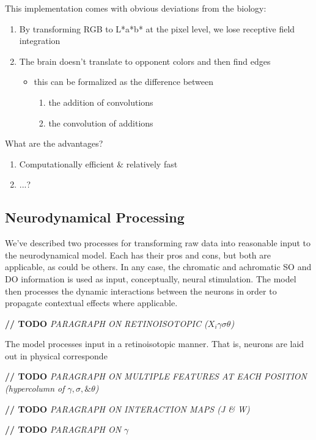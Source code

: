 \documentclass[journal,onecolumn]{IEEEtran}
\begin{document}
This implementation comes with obvious deviations from the biology:
\begin{enumerate}
    \item By transforming RGB to L*a*b* at the pixel level, we lose receptive field integration
    \item The brain doesn't translate to opponent colors and then find edges
    \begin{itemize}
        \item this can be formalized as the difference between
        \begin{enumerate}
            \item the addition of convolutions
            \item the convolution of additions
        \end{enumerate}
    \end{itemize}
\end{enumerate}

What are the advantages?
\begin{enumerate}
    \item Computationally efficient \& relatively fast
    \item ...?
\end{enumerate}


\subsection*{Neurodynamical Processing}

We've described two processes for transforming raw data into reasonable input to the neurodynamical model. Each has their pros and cons, but both are applicable, as could be others. In any case, the chromatic and achromatic SO and DO information is used as input, conceptually, neural stimulation. The model then processes the dynamic interactions between the neurons in order to propagate contextual effects where applicable.

\textbf{// TODO} \textit{PARAGRAPH ON RETINOISOTOPIC ($X_{i}\gamma\sigma\theta$)}

The model processes input in a retinoisotopic manner. That is, neurons are laid out in physical corresponde

\textbf{// TODO} \textit{PARAGRAPH ON MULTIPLE FEATURES AT EACH POSITION (hypercolumn of $\gamma, \sigma, \& \theta$)}

\textbf{// TODO} \textit{PARAGRAPH ON INTERACTION MAPS (J \& W)}

\textbf{// TODO} \textit{PARAGRAPH ON $\gamma$}
\end{document}
